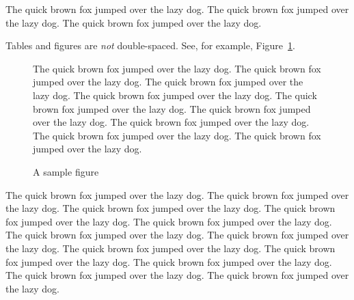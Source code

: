 \documentclass{unswthesis}
\begin{document}
The quick brown fox jumped over the lazy dog.  The quick brown fox jumped
over the lazy dog.  The quick brown fox jumped over the lazy dog.

Tables and figures are \emph{not} double-spaced. See, for example,
Figure~\ref{fg:sample}.
%
\begin{figure}
%
The quick brown fox jumped over the lazy dog.  The quick brown fox jumped
over the lazy dog.  The quick brown fox jumped over the lazy dog. The quick
brown fox jumped over the lazy dog.  The quick brown fox jumped over the
lazy dog.  The quick brown fox jumped over the lazy dog. The quick brown fox
jumped over the lazy dog.  The quick brown fox jumped over the lazy dog.
The quick brown fox jumped over the lazy dog.
%
\caption{A sample figure}\label{fg:sample}
\end{figure}

The quick brown fox jumped over the lazy dog.  The quick brown fox jumped
over the lazy dog.  The quick brown fox jumped over the lazy dog.  The quick
brown fox jumped over the lazy dog.  The quick brown fox jumped over the
lazy dog.  The quick brown fox jumped over the lazy dog.  The quick brown
fox jumped over the lazy dog.  The quick brown fox jumped over the lazy dog.
The quick brown fox jumped over the lazy dog.  The quick brown fox jumped
over the lazy dog.  The quick brown fox jumped over the lazy dog.  The quick
brown fox jumped over the lazy dog.
\end{document}
